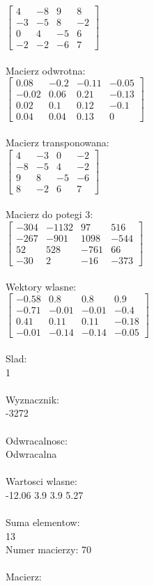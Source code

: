 \documentclass[a4paper,12pt]{article}
\begin{document}
$\begin{bmatrix} 4&-8&9&8\\-3&-5&8&-2\\0&4&-5&6\\-2&-2&-6&7 \end{bmatrix}$
\\
\\
Macierz odwrotna:\\

$\begin{bmatrix} 0.08&-0.2&-0.11&-0.05\\-0.02&0.06&0.21&-0.13\\0.02&0.1&0.12&-0.1\\0.04&0.04&0.13&0 \end{bmatrix}$
\\
\\
Macierz transponowana:\\

$\begin{bmatrix} 4&-3&0&-2\\-8&-5&4&-2\\9&8&-5&-6\\8&-2&6&7 \end{bmatrix}$
\\
\\
Macierz do potegi 3:\\

$\begin{bmatrix} -304&-1132&97&516\\-267&-901&1098&-544\\52&528&-761&66\\-30&2&-16&-373 \end{bmatrix}$
\\
\\
Wektory wlasne:\\

$\begin{bmatrix} -0.58&0.8&0.8&0.9\\-0.71&-0.01&-0.01&-0.4\\0.41&0.11&0.11&-0.18\\-0.01&-0.14&-0.14&-0.05 \end{bmatrix}$
\\
\\
Slad:\\
1
\\
\\
Wyznacznik:\\
-3272
\\
\\
Odwracalnosc:\\
Odwracalna
\\
\\
Wartosci wlasne:\\
-12.06 3.9 3.9 5.27
\\
\\
Suma elementow:\\
13
\\
\newpage
Numer macierzy:
70
\\
\\
Macierz:\\
\end{document}
